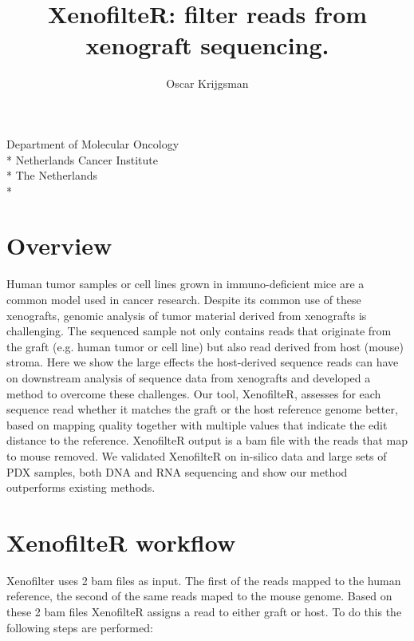 \documentclass{article}
\title{\bf XenofilteR: filter reads from xenograft sequencing.}
\author{Oscar Krijgsman}
\begin{document}


\maketitle

\begin{center}
  Department of Molecular Oncology \\*
  Netherlands Cancer Institute \\*
  The Netherlands \\*
\end{center}

\begin{center}
\end{center}

\tableofcontents


\section{Overview}

Human tumor samples or cell lines grown in immuno-deficient mice are a common model used in cancer research. Despite its common use of these xenografts, genomic analysis of tumor material derived from xenografts is challenging. The sequenced sample not only contains reads that originate from the graft (e.g. human tumor or cell line) but also read derived from host (mouse) stroma. Here we show the large effects the host-derived sequence reads can have on downstream analysis of sequence data from xenografts and developed a method to overcome these challenges. 
Our tool, XenofilteR, assesses for each sequence read whether it matches the graft or the host reference genome better, based on mapping quality together with multiple values that indicate the edit distance to the reference. XenofilteR output is a bam file with the reads that map to mouse removed. We validated XenofilteR on in-silico data and large sets of PDX samples, both DNA and RNA sequencing and show our method outperforms existing methods.


\section{XenofilteR workflow}

Xenofilter uses 2 bam files as input. The first of the reads mapped to the human reference, the second of the same reads maped to the mouse genome. Based on these 2 bam files XenofilteR assigns a read to either graft or host. To do this the following steps are performed:
\end{document}
